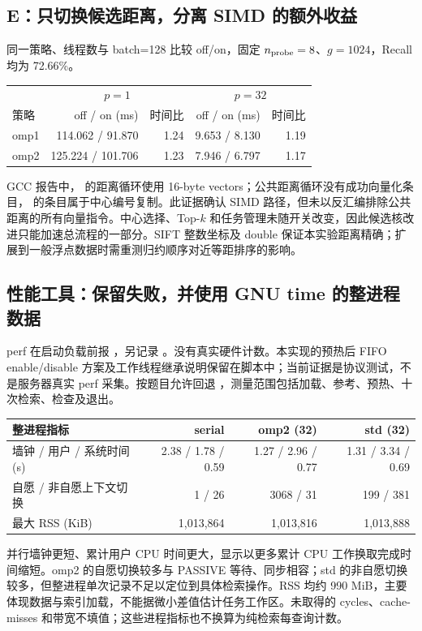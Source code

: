 \subsection{E：只切换候选距离，分离 SIMD 的额外收益}
同一策略、线程数与 batch=128 比较 off/on，固定 $n_{\rm probe}=8$、$g=1024$，Recall 均为 72.66\%。
\begin{center}
\smalltable
\begin{tabular}{lrrrr}
\toprule
 &\multicolumn{2}{c}{$p=1$}&\multicolumn{2}{c}{$p=32$}\\
策略&off / on (ms)&时间比&off / on (ms)&时间比\\
\midrule
omp1&114.062 / 91.870&1.24&9.653 / 8.130&1.19\\
omp2&125.224 / 101.706&1.23&7.946 / 6.797&1.17\\
\bottomrule
\end{tabular}
\end{center}
GCC 报告中， 的距离循环使用 16-byte vectors；公共距离循环没有成功向量化条目， 的条目属于中心编号复制。此证据确认 SIMD 路径，但未以反汇编排除公共距离的所有向量指令。中心选择、Top-$k$ 和任务管理未随开关改变，因此候选核改进只能加速总流程的一部分。SIFT 整数坐标及 double 保证本实验距离精确；扩展到一般浮点数据时需重测归约顺序对近等距排序的影响。

\subsection{性能工具：保留失败，并使用 GNU time 的整进程数据}
perf 在启动负载前报 ，另记录 。没有真实硬件计数。本实现的预热后 FIFO enable/disable 方案及工作线程继承说明保留在脚本中；当前证据是协议测试，不是服务器真实 perf 采集。按题目允许回退 ，测量范围包括加载、参考、预热、十次检索、检查及退出。
\begin{center}
\smalltable
\begin{tabular}{lrrr}
\toprule
整进程指标&serial&omp2 (32)&std (32)\\
\midrule
墙钟 / 用户 / 系统时间 (s)&2.38 / 1.78 / 0.59&1.27 / 2.96 / 0.77&1.31 / 3.34 / 0.69\\
自愿 / 非自愿上下文切换&1 / 26&3068 / 31&199 / 381\\
最大 RSS (KiB)&1,013,864&1,013,816&1,013,888\\
\bottomrule
\end{tabular}
\end{center}
并行墙钟更短、累计用户 CPU 时间更大，显示以更多累计 CPU 工作换取完成时间缩短。omp2 的自愿切换较多与 PASSIVE 等待、同步相容；std 的非自愿切换较多，但整进程单次记录不足以定位到具体检索操作。RSS 均约 990 MiB，主要体现数据与索引加载，不能据微小差值估计任务工作区。未取得的 cycles、cache-misses 和带宽不填值；这些进程指标也不换算为纯检索每查询计数。

